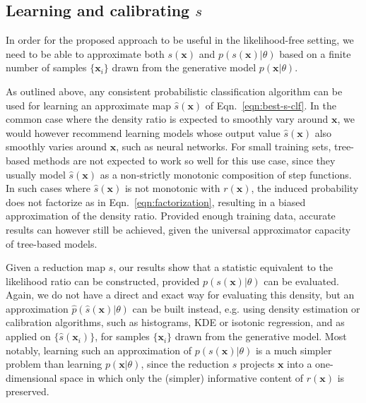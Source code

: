 \documentclass[12pt]{article}
\numberwithin{equation}{section}
\theoremstyle{plain}
\begin{document}
\subsection{Learning and calibrating $s$}

In order for the proposed approach to be useful in the likelihood-free setting,
we need to be able to approximate both $s(\mathbf{x})$ and
$p(s(\mathbf{x})|\theta)$ based on a finite number of samples $\{\mathbf{x}_i\}$
drawn from the generative model $p(\mathbf{x}|\theta)$.

As outlined above, any consistent probabilistic classification algorithm can be
used for learning an approximate  map $\hat{s}(\mathbf{x})$ of
Eqn.~\ref{eqn:best-s-clf}. In the common case where the density ratio is
expected to smoothly vary around $\mathbf{x}$, we would however recommend
learning models whose output value $\hat{s}(\mathbf{x})$ also smoothly varies
around $\mathbf{x}$, such as neural networks. For small training sets, tree-based
methods are not expected to work so well for this use case, since they usually
model $\hat{s}(\mathbf{x})$ as a non-strictly monotonic composition of step functions.
In such cases where $\hat s(\mathbf{x})$ is not monotonic with $r(\mathbf{x})$,
the induced probability does not factorize as in Eqn.~\ref{eqn:factorization}, resulting in a biased
approximation of the density ratio.
Provided enough training data, accurate results can however still be achieved,
given the universal approximator capacity of tree-based models.

Given a reduction map $s$, our results show that a statistic equivalent to the
likelihood ratio can be constructed, provided $p(s(\mathbf{x})|\theta)$ can be
evaluated. Again, we do not have a direct and exact way for evaluating this
density, but an approximation $\hat p(\hat s(\mathbf{x})| \theta)$ can be built
instead, e.g. using density estimation or calibration algorithms, such as
histograms, KDE or isotonic regression, and as applied on $\{\hat
s(\mathbf{x}_i)\}$, for samples $\{\mathbf{x}_i\}$  drawn from the generative
model. Most notably, learning such an approximation of $p(s(\mathbf{x})|\theta)$
is a much simpler problem than learning $p(\mathbf{x}|\theta)$, since the
reduction $s$ projects $\mathbf{x}$ into a one-dimensional space in which only
the (simpler) informative content of $r(\mathbf{x})$ is preserved.
\end{document}
